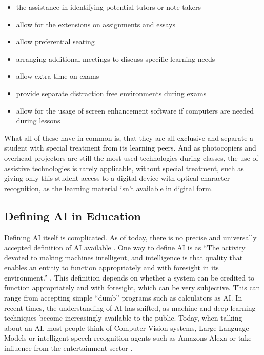 \documentclass{Academic}
\begin{document}
    \begin{itemize}
        \item the assistance in identifying potential tutors or note-takers
        \item allow for the extensions on assignments and essays
        \item allow preferential seating
        \item arranging additional meetings to discuss specific learning needs
        \item allow extra time on exams
        \item provide separate distraction free environments during exams
        \item allow for the usage of screen enhancement software if computers are needed during lessons
    \end{itemize}
    What all of these have in common is, that they are all exclusive and separate a student with special treatment from its learning peers. And as photocopiers and overhead projectors are still the most used technologies during classes, the use of assistive technologies is rarely applicable, without special treatment, such as giving only this student access to a digital device with optical character recognition, as the learning material isn't available in digital form.


    \subsection{Defining AI in Education}
    Defining AI itself is complicated. As of today, there is no precise and universally accepted definition of AI available \cite{Stanford_AI}. One way to define AI is as \enquote{The activity devoted to making machines intelligent, and intelligence is that quality that enables an entitiy to function appropriately and with foresight in its environment.} \cite{Stanford_AI}. This definition depends on whether a system can be credited to function appropriately and with foresight, which can be very subjective. This can range from accepting simple \enquote{dumb} programs such as calculators as AI. In recent times, the understanding of AI has shifted, as machine and deep learning techniques become increasingly available to the public. Today, when talking about an AI, most people think of Computer Vision systems, Large Language Models or intelligent speech recognition agents such as Amazons Alexa or take influence from the entertainment sector \cite{nader_public_2022}.
\end{document}
